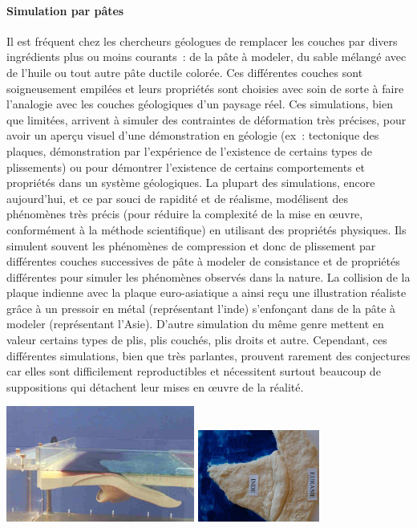 \documentclass[a4paper,11pt]{article}
\begin{document}
\paragraph{Simulation par pâtes}
\medbreak
Il est fréquent chez les chercheurs géologues de remplacer les couches par divers ingrédients plus ou moins courants~: de la pâte à modeler, du sable mélangé avec de l'huile ou tout autre pâte ductile colorée.
Ces différentes couches sont soigneusement empilées et leurs propriétés sont choisies avec soin de sorte à faire l'analogie avec les couches géologiques d'un paysage réel.
Ces simulations, bien que limitées, arrivent à simuler des contraintes de déformation très précises, pour avoir un aperçu visuel d'une démonstration en géologie (ex~: tectonique des plaques, démonstration par l'expérience de l'existence de certains types de plissements) ou pour démontrer l'existence de certains comportements et propriétés dans un système géologiques.
La plupart des simulations, encore aujourd'hui, et ce par souci de rapidité et de réalisme, modélisent des phénomènes très précis (pour réduire la complexité de la mise en œuvre, conformément à la méthode scientifique) en utilisant des propriétés physiques.
Ils simulent souvent les phénomènes de compression et donc de plissement par différentes couches successives de pâte à modeler de consistance et de propriétés différentes pour simuler les phénomènes observés dans la nature.
La collision de la plaque indienne avec la plaque euro-asiatique a ainsi reçu une illustration réaliste grâce à un pressoir en métal (représentant l'inde) s'enfonçant dans de la pâte à modeler (représentant l'Asie).
D'autre simulation du même genre mettent en valeur certains types de plis, plis couchés, plis droits et autre. Cependant, ces différentes simulations, bien que très parlantes, prouvent rarement des conjectures car elles sont difficilement reproductibles et nécessitent surtout beaucoup de suppositions qui détachent leur mises en œuvre de la réalité.

\begin{center}
  \includegraphics[width=6.2cm]{Images/simulation_physique.png}
  \includegraphics[width=4cm, angle=90]{Images/inde.jpg}
\end{center}
\end{document}
